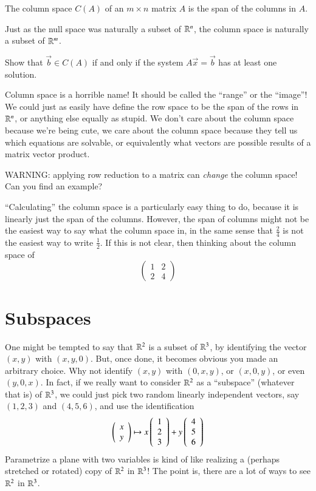 \begin{Def}
  The column space $C(A)$ of an $m\times n$ matrix $A$ is the span of the columns in $A$.
\end{Def}
\begin{Remark}
  Just as the null space was naturally a subset of $\mathbb{R}^n$, the column space is naturally a subset of $\mathbb{R}^m$.  
\end{Remark}
\begin{EasyEx}
  Show that $\vec{b}\in C(A)$ if and only if the system $A\vec{x}=\vec{b}$ has at least one solution.
\end{EasyEx}
\begin{Remark}
  Column space is a horrible name!
  It should be called the ``range'' or the ``image''!
  We could just as easily have define the row space to be the span of the rows in $\mathbb{R}^n$, or anything else equally as stupid.
  We don't care about the column space because we're being cute, we care about the column space because they tell us which equations are solvable, or equivalently what vectors are possible results of a matrix vector product.  
\end{Remark}
\begin{Ex}
  WARNING: applying row reduction to a matrix can \emph{change} the column space!
  Can you find an example?  
\end{Ex}
\begin{Remark}
  ``Calculating'' the column space is a particularly easy thing to do, because it is linearly just the span of the columns.
  However, the span of columns might not be the easiest way to say what the column space in, in the same sense that $\frac{2}{4}$ is not the easiest way to write $\frac{1}{2}$.  If this is not clear, then thinking about the column space of
  \[\left(\begin{array}{cc} 1 & 2 \\ 2 & 4\end{array}\right)\]
\end{Remark}

\exersisesi

\section{Subspaces}

One might be tempted to say that $\mathbb{R}^2$ is a subset of $\mathbb{R}^3$, by identifying the vector $(x,y)$ with $(x,y,0)$.  
But, once done, it becomes obvious you made an arbitrary choice.  
Why not identify $(x,y)$ with $(0,x,y)$, or $(x,0,y)$, or even $(y,0,x)$.  
In fact, if we really want to consider $\mathbb{R}^2$ as a ``subspace'' (whatever that is) of $\mathbb{R}^3$, we could just pick two random linearly independent vectors, say $(1,2,3)$ and $(4,5,6)$, and use the identification
\[\left(\begin{array}{c}x\\y\end{array}\right) \mapsto x\left(\begin{array}{c}1\\2\\3\end{array}\right) + y\left(\begin{array}{c}4\\5\\6\end{array}\right)\]
Parametrize a plane with two variables is kind of like realizing a (perhaps stretched or rotated) copy of $\mathbb{R}^2$ in $\mathbb{R}^3$!
The point is, there are a lot of ways to see $\mathbb{R}^2$ in $\mathbb{R}^3$.

